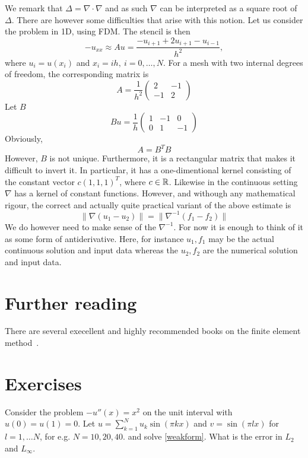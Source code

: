 We remark that $\Delta=\nabla\cdot\nabla$ and as such $\nabla$ can be interpreted
as a square root of $\Delta$. There are however some difficulties that
arise with this notion. Let us consider the problem in 1D, using FDM. The stencil 
is then 
\[
- u_{xx} \approx A u =  \frac{-u_{i+1} + 2 u_{i+1}  -u_{i-1}}{h^2}, 
\]  
where $u_i= u(x_i)$ and $x_i = ih, \ i=0,\ldots, N$. 
For a mesh with two internal degrees of freedom, the corresponding matrix 
is 
\[
A = 
\frac{1}{h^2}\begin{pmatrix}
2 & -1 \\ -1 & 2 
\end{pmatrix}
\]
Let $B$ 
\[
B u = 
\frac{1}{h}\begin{pmatrix}
1 & -1 & 0  \\ 0 & 1 & -1  
\end{pmatrix}
\]
Obviously,  
\[
A = B^T B 
\]
However, $B$ is not unique. Furthermore, it is a rectangular matrix that makes
it difficult to invert it. In particular, it has a one-dimentional kernel
consisting of the constant vector $c (1,1,1)^T$, where $c\in \mathbb{R}$. Likewise
in the continuous setting $\nabla$ has a kernel of constant functions.  
However, and withough any mathematical rigour, 
the correct and actually quite practical 
variant of the above estimate is    
\[
\|\nabla (u_1 - u_2) \| = \|\nabla^{-1}(f_1 - f_2)\|     
\]
We do however need to make sense of the 
$\nabla^{-1}$. For now it is enough to think of it as some form of antiderivative. 
Here, for instance $u_1, f_1$ may be the actual continuous solution and input data whereas the 
$u_2, f_2$ are the numerical solution and input data. 

\section{Further reading}
There are several execellent and highly recommended books on the finite element method~\cite{braess2007finite, brenner2008mathematical}. 


\section{Exercises}

\begin{exercise}
Consider the problem $-u''(x) = x^2$ on the unit interval with $u(0) = u(1) = 0$.  
Let $u=\sum_{k=1}^{N} u_k \sin(\pi k x )$ and $v=\sin(\pi l x)$ for $l=1, \ldots N$, for e.g. $N=10, 20, 40$. 
and solve \eqref{weakform}. What is the error in $L_2$ and $L_\infty$.  
\end{exercise}

